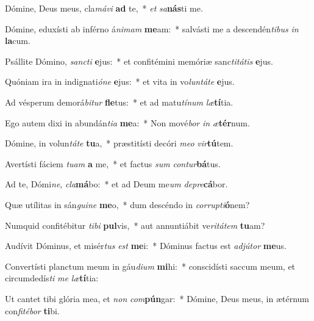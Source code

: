 \item Dómine, Deus meus, cla\textit{má}\textit{vi} \textbf{ad} te,~* \textit{et} \textit{sa}\textbf{nás}ti me.
\item Dómine, eduxísti ab inférno á\textit{ni}\textit{mam} \textbf{me}am:~* salvásti me a descendén\textit{ti}\textit{bus} \textit{in} \textbf{la}cum.
\item Psállite Dómino, \textit{sanc}\textit{ti} \textbf{e}jus:~* et confitémini memóriæ sanc\textit{ti}\textit{tá}\textit{tis} \textbf{e}jus.
\item Quóniam ira in indignati\textit{ó}\textit{ne} \textbf{e}jus:~* et vita in vo\textit{lun}\textit{tá}\textit{te} \textbf{e}jus.
\item Ad vésperum demorá\textit{bi}\textit{tur} \textbf{fle}tus:~* et ad matu\textit{tí}\textit{num} \textit{læ}\textbf{tí}tia.
\item Ego autem dixi in abundán\textit{ti}\textit{a} \textbf{me}a:~* Non mové\textit{bor} \textit{in} \textit{æ}\textbf{tér}num.
\item Dómine, in volun\textit{tá}\textit{te} \textbf{tu}a,~* præstitísti decóri \textit{me}\textit{o} \textit{vir}\textbf{tú}tem.
\item Avertísti fáciem \textit{tu}\textit{am} \textbf{a} me,~* et factus \textit{sum} \textit{con}\textit{tur}\textbf{bá}tus.
\item Ad te, Dómi\textit{ne}, \textit{cla}\textbf{má}bo:~* et ad Deum me\textit{um} \textit{de}\textit{pre}\textbf{cá}bor.
\item Quæ utílitas in sán\textit{gui}\textit{ne} \textbf{me}o,~* dum descéndo in \textit{cor}\textit{rup}\textit{ti}\textbf{ó}nem?
\item Numquid confitébitur \textit{ti}\textit{bi} \textbf{pul}vis,~* aut annuntiábit ve\textit{ri}\textit{tá}\textit{tem} \textbf{tu}am?
\item Audívit Dóminus, et misér\textit{tus} \textit{est} \textbf{me}i:~* Dóminus factus est \textit{ad}\textit{jú}\textit{tor} \textbf{me}us.
\item Convertísti planctum meum in gáu\textit{di}\textit{um} \textbf{mi}hi:~* conscidísti saccum meum, et circumdedís\textit{ti} \textit{me} \textit{læ}\textbf{tí}tia:
\item Ut cantet tibi glória mea, et \textit{non} \textit{com}\textbf{pún}gar:~* Dómine, Deus meus, in ætérnum con\textit{fi}\textit{té}\textit{bor} \textbf{ti}bi.
